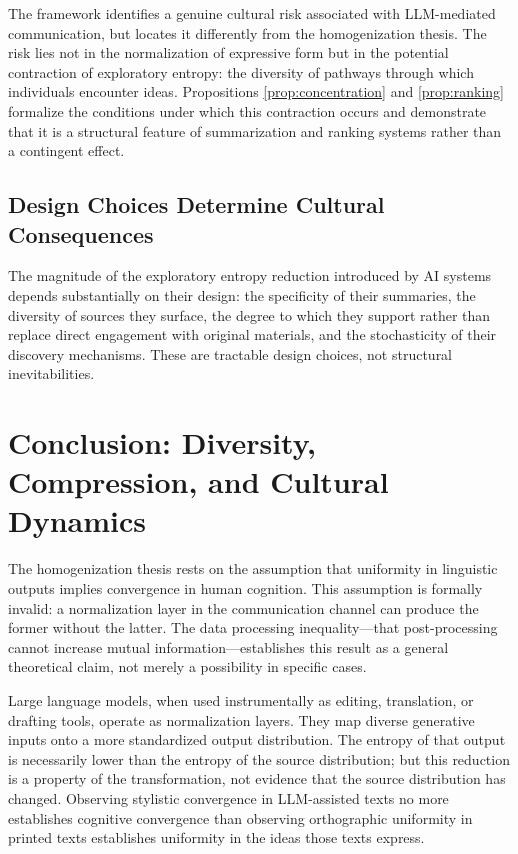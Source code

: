 \documentclass[12pt,a4paper]{article}
\theoremstyle{definition}
\theoremstyle{plain}
\theoremstyle{remark}
\begin{document}
The framework identifies a genuine cultural risk associated with LLM-mediated communication,
but locates it differently from the homogenization thesis. The risk lies not in the
normalization of expressive form but in the potential contraction of exploratory entropy:
the diversity of pathways through which individuals encounter ideas. Propositions
\ref{prop:concentration} and \ref{prop:ranking} formalize the conditions under which this
contraction occurs and demonstrate that it is a structural feature of summarization and
ranking systems rather than a contingent effect.

\subsection{Design Choices Determine Cultural Consequences}

The magnitude of the exploratory entropy reduction introduced by AI systems depends
substantially on their design: the specificity of their summaries, the diversity of sources
they surface, the degree to which they support rather than replace direct engagement with
original materials, and the stochasticity of their discovery mechanisms. These are tractable
design choices, not structural inevitabilities.

\section{Conclusion: Diversity, Compression, and Cultural Dynamics}
\label{sec:conclusion}

The homogenization thesis rests on the assumption that uniformity in linguistic outputs
implies convergence in human cognition. This assumption is formally invalid: a normalization
layer in the communication channel can produce the former without the latter. The data
processing inequality---that post-processing cannot increase mutual information---establishes
this result as a general theoretical claim, not merely a possibility in specific cases.

Large language models, when used instrumentally as editing, translation, or drafting tools,
operate as normalization layers. They map diverse generative inputs onto a more standardized
output distribution. The entropy of that output is necessarily lower than the entropy of the
source distribution; but this reduction is a property of the transformation, not evidence
that the source distribution has changed. Observing stylistic convergence in LLM-assisted
texts no more establishes cognitive convergence than observing orthographic uniformity in
printed texts establishes uniformity in the ideas those texts express.
\end{document}
